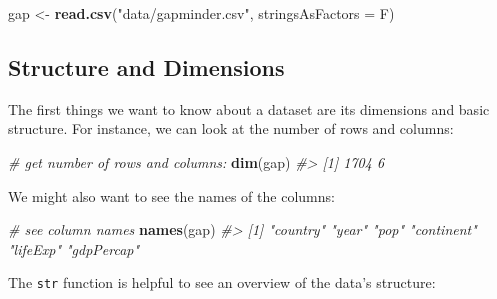 \documentclass[]{book}
\newenvironment{Shaded}{\begin{snugshade}}{\end{snugshade}}
\newcommand{\KeywordTok}[1]{\textcolor[rgb]{0.13,0.29,0.53}{\textbf{#1}}}
\newcommand{\DataTypeTok}[1]{\textcolor[rgb]{0.13,0.29,0.53}{#1}}
\newcommand{\StringTok}[1]{\textcolor[rgb]{0.31,0.60,0.02}{#1}}
\newcommand{\CommentTok}[1]{\textcolor[rgb]{0.56,0.35,0.01}{\textit{#1}}}
\newcommand{\NormalTok}[1]{#1}
\begin{document}
\begin{Shaded}
\begin{Highlighting}[]
\NormalTok{gap <-}\StringTok{ }\KeywordTok{read.csv}\NormalTok{(}\StringTok{"data/gapminder.csv"}\NormalTok{, }\DataTypeTok{stringsAsFactors =}\NormalTok{ F)}
\end{Highlighting}
\end{Shaded}

\subsection{Structure and Dimensions}\label{structure-and-dimensions}

The first things we want to know about a dataset are its dimensions and
basic structure. For instance, we can look at the number of rows and
columns:

\begin{Shaded}
\begin{Highlighting}[]
\CommentTok{# get number of rows and columns:}
\KeywordTok{dim}\NormalTok{(gap)}
\CommentTok{#> [1] 1704    6}
\end{Highlighting}
\end{Shaded}

We might also want to see the names of the columns:

\begin{Shaded}
\begin{Highlighting}[]
\CommentTok{# see column names}
\KeywordTok{names}\NormalTok{(gap)}
\CommentTok{#> [1] "country"   "year"      "pop"       "continent" "lifeExp"   "gdpPercap"}
\end{Highlighting}
\end{Shaded}

The \texttt{str} function is helpful to see an overview of the data's
structure:

\begin{Shaded}
\end{Shaded}
\end{document}

